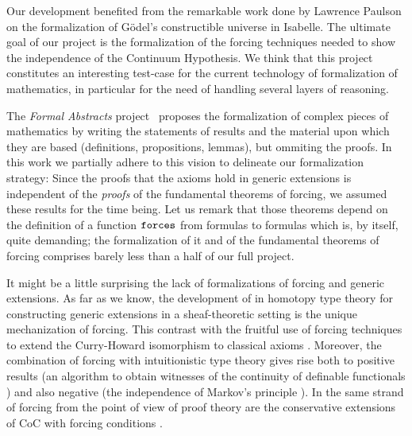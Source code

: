 Our development benefited from the remarkable work done by Lawrence
Paulson \cite{paulson_2003} on the formalization of G\"odel's
constructible universe in Isabelle. The
ultimate goal of our project is the formalization of the forcing
techniques needed to show the independence of the Continuum
Hypothesis. 
We think that this project constitutes an interesting test-case
for the current technology of formalization of mathematics, in
particular for the need of handling several layers of reasoning. 

The \emph{Formal Abstracts} project~\cite{hales-fabstracts} proposes
the formalization of complex pieces of mathematics by writing the
statements of 
results and the material upon which they are based (definitions,
propositions, lemmas), but ommiting the proofs. In this work we
partially adhere to this vision to delineate our formalization
strategy:
Since the proofs that the  axioms hold in generic extensions
is independent of the \emph{proofs} of the fundamental theorems of
forcing, we assumed these results for the time being. Let us remark
that those theorems depend on the definition of a function $\mathop{\mathtt{forces}}$
from formulas to formulas which is, by itself, quite demanding; the
formalization of it and of the fundamental theorems of forcing %
comprises barely less than a half of our full project.

It might be a little surprising the lack of formalizations of forcing
and generic extensions. As far as we know, the development of
\citet{JFR6232} in homotopy type theory for constructing generic
extensions in a sheaf-theoretic setting is the unique mechanization of
forcing. This contrast with the fruitful use of forcing techniques to
extend the Curry-Howard isomorphism to classical axioms
\cite{Miquel:2011:FPT:2058525.2059614,lmcs:1070}. Moreover, the
combination of forcing with intuitionistic type theory
\cite{Coquand:2009:FTT:1807662.1807665,coquand2010note} gives rise
both to positive results (an algorithm to obtain witnesses of the
continuity of definable functionals \cite{coquand2012computational})
and also negative (the independence of Markov's principle
\cite{lmcs:3859}). In the same strand of forcing from the point of
view of proof theory \cite{avigad_2004} are the conservative
extensions of CoC with forcing conditions
\cite{jaber:hal-01319066,Jaber:2012:ETT:2358958.2359524}.


